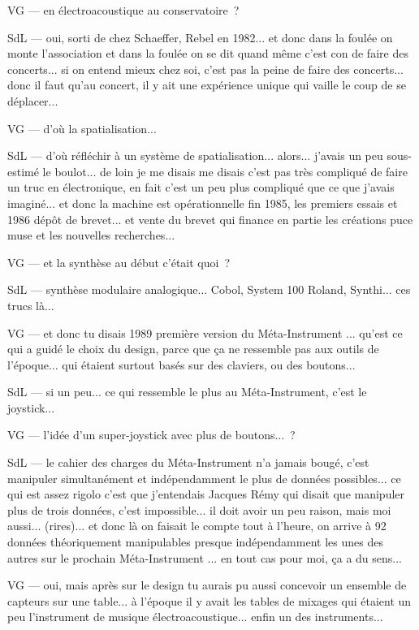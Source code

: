 VG — en électroacoustique au conservatoire ? 

SdL — oui, sorti de chez Schaeffer, Rebel en 1982... et donc dans la foulée on monte l'association et dans la foulée on se dit quand même c'est con de faire des concerts... si on entend mieux chez soi, c'est pas la peine de faire des concerts... donc il faut qu'au concert, il y ait une expérience unique qui vaille le coup de se déplacer... 

VG — d'où la spatialisation... 

SdL — d'où réfléchir à un système de spatialisation... alors... j'avais un peu sous-estimé le boulot... de loin je me disais me disais c'est pas très compliqué de faire un truc en électronique, en fait c'est un peu plus compliqué que ce que j'avais imaginé... et donc la machine est opérationnelle fin 1985, les premiers essais et 1986 dépôt de brevet... et vente du brevet qui finance en partie les créations puce muse et les nouvelles recherches... 

VG — et la synthèse au début c'était quoi ? 

SdL — synthèse modulaire analogique... Cobol, System 100 Roland, Synthi... ces trucs là... 

VG — et donc tu disais 1989 première version du Méta-Instrument ... qu'est ce qui a guidé le choix du design, parce que ça ne ressemble pas aux outils de l'époque... qui étaient surtout basés sur des claviers, ou des boutons... 

SdL — si un peu... ce qui ressemble le plus au Méta-Instrument, c'est le joystick... 

VG — l'idée d'un super-joystick avec plus de boutons... ? 

SdL — le cahier des charges du Méta-Instrument n'a jamais bougé, c'est manipuler simultanément et indépendamment le plus de données possibles... ce qui est assez rigolo c'est que j'entendais Jacques Rémy qui disait que manipuler plus de trois données, c'est impossible... il doit avoir un peu raison, mais moi aussi... (rires)... et donc là on faisait le compte tout à l'heure, on arrive à 92 données théoriquement manipulables presque indépendamment les unes des autres sur le prochain Méta-Instrument ... en tout cas pour moi, ça a du sens... 

VG — oui, mais après sur le design tu aurais pu aussi concevoir un ensemble de capteurs sur une table... à l'époque il y avait les tables de mixages qui étaient un peu l'instrument de musique électroacoustique... enfin un des instruments... 

